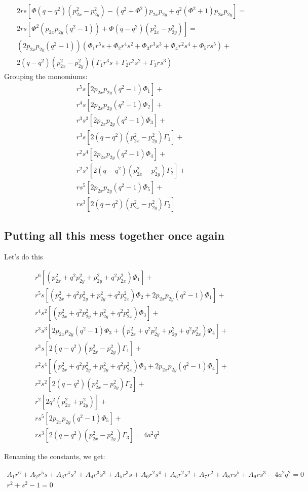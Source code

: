\documentclass{article}
\begin{document}
\begin{align*}
2rs[\Phi(q-q^2)(p_{2x}^2-p_{2y}^2) - (q^2+\Phi^2)p_{2x}p_{2y} + q^2(\Phi^2+1)p_{2x}p_{2y}]=\\
2rs[\Phi^2(p_{2x}p_{2y}(q^2-1)) + \Phi(q-q^2)(p_{2x}^2-p_{2y}^2)]=\\
(2p_{2x}p_{2y}(q^2-1))(\Phi_1 r^5s + \Phi_2 r^4s^2 + \Phi_3r^3s^3 + \Phi_4r^2s^4 + \Phi_5rs^5)+\\
2(q-q^2)(p_{2x}^2-p_{2y}^2)(\Gamma_1r^3s + \Gamma_2r^2s^2 + \Gamma_3rs^3)
\end{align*}
Grouping the monomiums:
\newcommand{\pcoeff}{2p_{2x}p_{2y}(q^2-1)}
\newcommand{\pcoef}{2(q-q^2)(p_{2x}^2-p_{2y}^2)}
\begin{align*}
r^5s[\pcoeff\Phi_1]+\\
r^4s[\pcoeff\Phi_2]+\\
r^3s^3[\pcoeff\Phi_3]+\\
r^3s[\pcoef\Gamma_1]+\\
r^2s^4[\pcoeff\Phi_4]+\\
r^2s^2[\pcoef\Gamma_2]+\\
rs^5[\pcoeff\Phi_5]+\\
rs^3[\pcoef\Gamma_3]
\end{align*}

\subsection{Putting all this mess together once again}
Let's do this

\begin{align*}
r^6[(p_{2x}^2+q^2p_{2y}^2 + p_{2y}^2+q^2p_{2x}^2)\Phi_1]+\\
r^5s[(p_{2x}^2+q^2p_{2y}^2 + p_{2y}^2+q^2p_{2x}^2)\Phi_2 + \pcoeff\Phi_1]+\\
r^4s^2[(p_{2x}^2+q^2p_{2y}^2 + p_{2y}^2+q^2p_{2x}^2)\Phi_3]+\\
r^3s^3[\pcoeff\Phi_3 + (p_{2x}^2+q^2p_{2y}^2 + p_{2y}^2+q^2p_{2x}^2)\Phi_4]+\\
r^3s[\pcoef\Gamma_1]+\\
r^2s^4[(p_{2x}^2+q^2p_{2y}^2 + p_{2y}^2+q^2p_{2x}^2)\Phi_3 + \pcoeff\Phi_4]+\\
r^2s^2[\pcoef\Gamma_2]+\\
r^2[2q^2(p_{2x}^2+p_{2y}^2)]+\\
rs^5[\pcoeff\Phi_5]+\\
rs^3[\pcoef\Gamma_3]=4a^2q^2
\end{align*}

Renaming the constants, we get:

\begin{align*}
A_1r^6 + A_2r^5s + A_3r^4s^2 + A_4r^3s^3 + A_5r^3s + A_6r^2s^4 + A_6r^2s^2 + A_7r^2 + A_8rs^5 + A_9rs^3 - 4a^2q^2 = 0\\
r^2 + s^2 -1 = 0
\end{align*}
\end{document}
